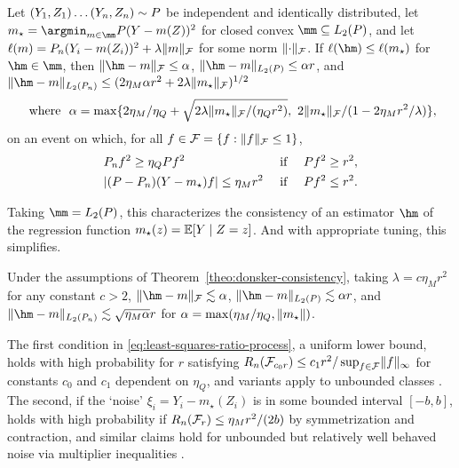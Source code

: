 \begin{theo}
\label{theo:donsker-consistency}
Let $(Y_1,Z_1)\ldots(Y_n,Z_n) \sim \P$ be independent and identically distributed, 
let $m_{\star} = \argmin_{m \in \mm}\P (Y - m(Z))^2$ for closed convex $\mm \subseteq L_2(\P)$,
and let $\ell(m) =  \Pn (Y_i - m(Z_i))^2 + \lambda \norm{m}_{\F}$ for some norm $\lVert\cdot\rVert_{\mathcal{F}}$.
If $\ell(\hm) \le \ell(m_{\star})$ for $\hm \in \mm$, then 
$\norm{\hm-m}_{\F} \le \alpha$, $\norm{\hm-m}_{L_2(\P)} \le \alpha r$, and 
$\norm{\hm-m}_{L_2(\Pn)} \le (2\eta_M \alpha r^2 + 2\lambda \norm{m_{\star}}_{\F})^{1/2}$   
\[ \text{ where }\ \alpha = \max\set{ 2\eta_M/\eta_Q + \sqrt{2\lambda \norm{m_{\star}}_{\F}/(\eta_Q r^2)},\ 2\norm{m_{\star}}_{\F}/(1-2\eta_M r^2/\lambda)}, \]
on an event on which, for all $f \in \mathcal{F} = \{f : \lVert f\rVert_{\mathcal{F}} \le 1\}$,
\begin{equation}
\label{eq:least-squares-ratio-process}
\begin{aligned}
&\Pn f^2 \ge \eta_Q \P f^2          	       && \text{ if }\quad \P f^2 \ge r^2, \\
&\abs{(\P - \Pn)(Y-m_{\star})f} \le \eta_M r^2  && \text{ if }\quad \P f^2 \le r^2.
\end{aligned}
\end{equation}
\end{theo}


Taking $\mm = L_2(\P)$, this characterizes the consistency of an estimator $\hm$ of 
the regression function $m_{\star}(z) = \E[Y \mid Z=z]$. And with appropriate tuning, this simplifies.

\begin{coro}
Under the assumptions of Theorem~\ref{theo:donsker-consistency}, 
taking $\lambda=c\eta_Mr^2$ for any constant $c > 2$,  
$\norm{\hm-m}_{\F} \lesssim \alpha$, 
$\norm{\hm - m}_{L_2(\P)} \lesssim \alpha r$,
and $\norm{\hm - m}_{L_2(\Pn)} \lesssim \sqrt{\eta_M \alpha}r$ 
for $\alpha = \max(\eta_M/\eta_Q, \lVert m_{\star}\rVert)$.
\end{coro} 

The first condition in \eqref{eq:least-squares-ratio-process},
a uniform lower bound, holds with high probability for $r$ satisfying 
$R_n(\mathcal{F}_{c_0r}) \le c_1 r^2/\sup_{f \in \mathcal{F}}\lVert f\rVert_{\infty}$ for constants $c_0$ and $c_1$ dependent on $\eta_Q$,
and variants apply to unbounded classes \citep{mendelson2017extending}.
The second, if the `noise' $\xi_i = Y_i - m_{\star}(Z_i)$ is in some bounded interval $[-b,b]$,
holds with high probability if $R_n(\mathcal{F}_{r}) \le \eta_M r^2/(2b)$
by symmetrization and contraction, and similar claims hold for unbounded but relatively well behaved noise
via multiplier inequalities \cite[see e.g.,][Section 3.14]{gine2015mathematical}.



